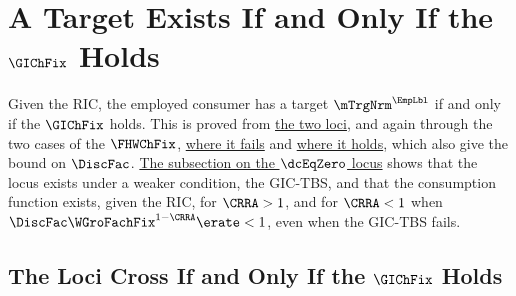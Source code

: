 \documentclass{econark}
\begin{document}
\section{A Target Exists If and Only If the $\GIChFix$ Holds}\label{sec:mTargExists}

Given the RIC, the employed consumer has a target $\mTrgNrm^{\EmpLbl}$ if and only if the $\GIChFix$ holds.  This is proved from \hyperref[sec:TractableBufferStock-LociCross]{the two loci}, and again through the two cases of the $\FHWChFix$, \hyperref[sec:TractableBufferStock-TargetWhenFHWChFixFails]{where it fails} and \hyperref[sec:TractableBufferStock-TargetWhenFHWChFixHolds]{where it holds}, which also give the bound on $\DiscFac$.  \hyperref[sec:TractableBufferStock-cLocusExists]{The subsection on the $\dcEqZero$ locus} shows that the locus exists under a weaker condition, the GIC-TBS, and that the consumption function exists, given the RIC, for $\CRRA > 1$, and for $\CRRA < 1$ when $\DiscFac \WGroFachFix^{1-\CRRA} \erate < 1$, even when the GIC-TBS fails.

\subsection{The Loci Cross If and Only If the $\GIChFix$ Holds}\label{sec:TractableBufferStock-LociCross}
 
\end{document}
